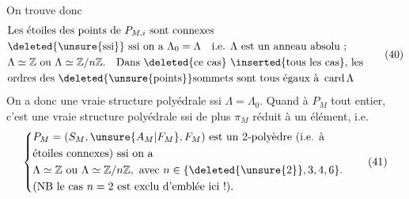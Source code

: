 On trouve donc
\[
\begin{aligned}
&\text{Les étoiles des points de }P_{M,i}\text{ sont connexes}\\
&\deleted{\unsure{\text{ssi}}}\text{ ssi on a }\Lambda_0=\Lambda\quad\text{i.e. }\Lambda\text{ est un anneau absolu}\ ;\\
&\Lambda\simeq\mathbb Z\text{ ou }\Lambda\simeq\mathbb Z/n\mathbb Z.\quad\text{Dans \deleted{ce cas} \inserted{tous les cas}, les}\\
&\text{ordres des \deleted{\unsure{points}}sommets sont tous égaux à }\operatorname{card}\Lambda
\end{aligned}\tag*{(40)}
\]
On a donc une vraie structure polyédrale
 ssi $\Lambda=\Lambda_0$. Quand à $P_M$ tout entier,
c'est une vraie structure polyédrale ssi
 de plus $\pi_M$ réduit à un élément,
i.e.
\[
\left\{\begin{aligned}
&P_M=(S_M,\unsure{A_M|F_M},F_M)\text{ est un }2\text{-polyèdre (i.e. à}\\
&\text{étoiles connexes) ssi on a}\\
&\Lambda\simeq\mathbb Z\text{ ou }\Lambda\simeq\mathbb Z/n\mathbb Z,\ \text{avec }n\in\{\deleted{\unsure{2}},3,4,6\}.\\
&\text{(NB le cas }n=2\text{ est exclu d'emblée ici !)}.
\end{aligned}\right.\tag*{(41)}
\]

